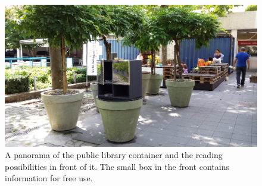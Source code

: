 \documentclass[a4paper,
fontsize=11pt,
oneside,
numbers=noperiodatend,
parskip=half-,
bibliography=totoc,
final
]{scrartcl}
\begin{document}
\begin{figure}[htbp]
\centering
\includegraphics{img/BlumerSchuldt04.jpg}
\caption{A panorama of the public library container and the reading
possibilities in front of it. The small box in the front contains
information for free use.}
\end{figure}
\end{document}
